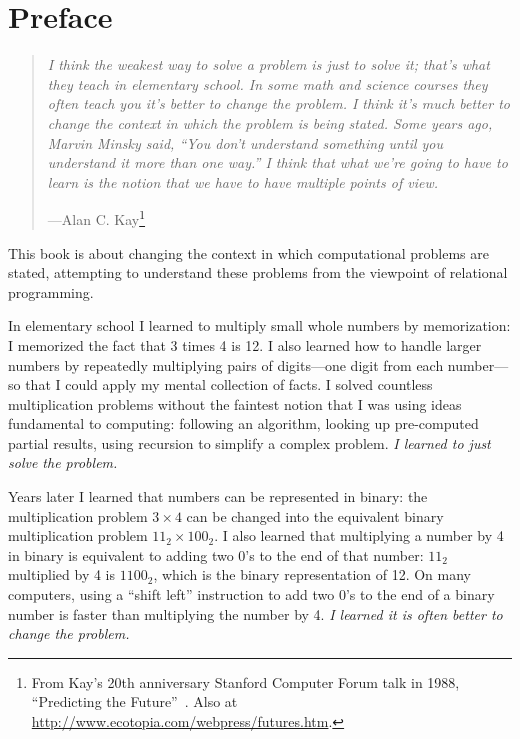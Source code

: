 %



\chapter{Preface}\label{sec:preface}

\vspace{-1cm}

\begin{quotation}
\noindent
\emph{I think the weakest way to solve a problem is just to solve it; that's what they teach in elementary school. In some math and science courses they often teach you it's better to change the problem. I think it's much better to change the context in which the problem is being stated. Some years ago, Marvin Minsky said, ``You don't understand something until you understand it more than one way.'' I think that what we're going to have to learn is the notion that we have to have multiple points of view.}
\begin{flushright}
\vspace{-0.3em}
---Alan C. Kay\footnote{From Kay's 20th anniversary Stanford Computer Forum talk in 1988, ``Predicting the Future''~\cite{Kay:1989}. Also at \url{http://www.ecotopia.com/webpress/futures.htm}.}
\end{flushright}
\end{quotation}


This book is about changing the context in which computational
problems are stated, attempting to understand these problems from the
viewpoint of relational programming.


In elementary school I learned to multiply small whole numbers by
memorization: I memorized the fact that 3 times 4 is 12.
%
I also learned how to handle larger numbers by repeatedly
multiplying pairs of digits---one digit from each number---so that I
could apply my mental collection of facts.
%
I solved countless multiplication problems without the faintest notion
that I was using ideas fundamental to computing: following an
algorithm, looking up pre-computed partial results, using recursion
to simplify a complex problem.
%
\emph{I learned to just solve the problem.}


Years later I learned that numbers can be represented in binary: the
multiplication problem \mbox{$3 \times 4$} can be changed into the
equivalent binary multiplication problem \mbox{$11_2 \times 100_2$}.
%
I also learned that multiplying a number by 4 in binary is equivalent
to adding two 0's to the end of that number: $11_2$ multiplied by 4 is
$1100_2$, which is the binary representation of 12.
%
On many computers, using a ``shift left'' instruction to add two 0's to
the end of a binary number is faster than multiplying the number by 4.
%
\emph{I learned it is often better to change the problem.}






